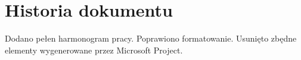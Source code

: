 \documentclass[10pt]{dokument-ppi}
\begin{document}
\section{Historia dokumentu}
\begin{versions}
        Dodano pełen harmonogram pracy.
        Poprawiono formatowanie.
        Usunięto zbędne elementy wygenerowane przez Microsoft Project.
\end{versions}
\end{document}
